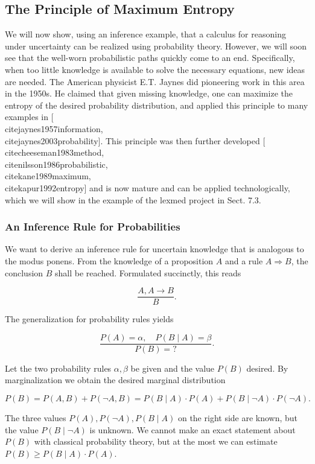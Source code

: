 \documentclass[10pt]{book}
\begin{document}
\subsection*{The Principle of Maximum Entropy}
We will now show, using an inference example, that a calculus for reasoning under uncertainty can be realized using probability theory. However, we will soon see that the well-worn probabilistic paths quickly come to an end. Specifically, when too little knowledge is available to solve the necessary equations, new ideas are needed. The American physicist E.T. Jaynes did pioneering work in this area in the 1950s. He claimed that given missing knowledge, one can maximize the entropy of the desired probability distribution, and applied this principle to many examples in [\\cite{jaynes1957information}, \\cite{jaynes2003probability}]. This principle was then further developed [\\cite{cheeseman1983method}, \\cite{nilsson1986probabilistic}, \\cite{kane1989maximum}, \\cite{kapur1992entropy}] and is now mature and can be applied technologically, which we will show in the example of the lexmed project in Sect. 7.3.

\subsubsection*{An Inference Rule for Probabilities}
We want to derive an inference rule for uncertain knowledge that is analogous to the modus ponens. From the knowledge of a proposition $A$ and a rule $A \Rightarrow B$, the conclusion $B$ shall be reached. Formulated succinctly, this reads

$$
\frac{A, A \rightarrow B}{B} .
$$

The generalization for probability rules yields


$$
\frac{P(A)=\alpha, \quad P(B \mid A)=\beta}{P(B)=?} .
$$

Let the two probability rules $\alpha, \beta$ be given and the value $P(B)$ desired. By marginalization we obtain the desired marginal distribution

$$
P(B)=P(A, B)+P(\neg A, B)=P(B \mid A) \cdot P(A)+P(B \mid \neg A) \cdot P(\neg A) .
$$

The three values $P(A), P(\neg A), P(B \mid A)$ on the right side are known, but the value $P(B \mid \neg A)$ is unknown. We cannot make an exact statement about $P(B)$ with classical probability theory, but at the most we can estimate $P(B) \geq P(B \mid A) \cdot P(A)$.
\end{document}
